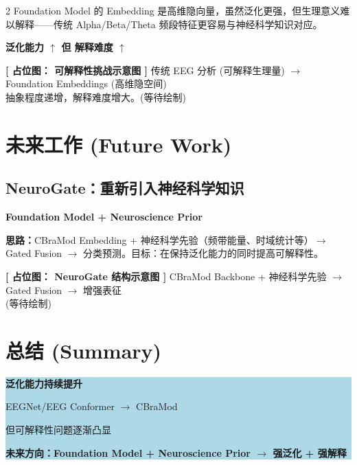 \documentclass[12pt, a0paper]{article}
\renewcommand{\normalsize}{\fontsize{20}{27}\selectfont}
\renewcommand{\large}{\fontsize{24}{32}\selectfont}
\renewcommand{\Large}{\fontsize{28}{36}\selectfont}
\renewcommand{\small}{\fontsize{16}{22}\selectfont}
\newcommand{\placeholderh}[3]{%
    \begin{center}
    \colorbox{mygray!12}{\parbox{0.9\columnwidth}{%
        \centering
        \vspace{1.2em}
        {\Large\bfseries\color{mygray} [ 占位图： #1 ]}
        \vspace{0.8em}
        {\small\color{mygray} #2}
        \vspace{#3}
    }}
    \end{center}
}
\begin{document}
\begin{multicols}{2}
Foundation Model 的 Embedding 是高维隐向量，虽然泛化更强，但生理意义难以解释——传统 Alpha/Beta/Theta 频段特征更容易与神经科学知识对应。

\begin{center}
\colorbox{myorange!10}{\parbox{0.9\columnwidth}{\centering\bfseries
    泛化能力 $\uparrow$ \hspace{2em} 但 \hspace{2em} 解释难度 $\uparrow$
}}
\end{center}

\placeholderh{可解释性挑战示意图}{%
    传统 EEG 分析 (可解释生理量) $\rightarrow$ Foundation Embeddings (高维隐空间)\\
    抽象程度递增，解释难度增大。\quad (等待绘制)}{2.5cm}

\section{未来工作 (Future Work)}

\subsection{NeuroGate：重新引入神经科学知识}

\begin{center}
\large\bfseries
Foundation Model \quad + \quad Neuroscience Prior
\end{center}

\textbf{思路：}CBraMod Embedding $+$ 神经科学先验（频带能量、时域统计等）$\rightarrow$ Gated Fusion $\rightarrow$ 分类预测。目标：在保持泛化能力的同时提高可解释性。

\placeholderh{NeuroGate 结构示意图}{%
    CBraMod Backbone + 神经科学先验 $\rightarrow$ Gated Fusion $\rightarrow$ 增强表征\\
    \small (等待绘制)}{2.8cm}

\section{总结 (Summary)}

\begin{center}
\colorbox{lightblue}{\parbox{0.95\columnwidth}{\centering
    {\Large\bfseries
        泛化能力持续提升\par}
    \vspace{0.8em}
    {\normalsize
        EEGNet/EEG Conformer $\rightarrow$ CBraMod\par}
    \vspace{0.5em}
    {\normalsize
        但可解释性问题逐渐凸显\par}
    \vspace{0.8em}
    {\large\bfseries
        未来方向：Foundation Model + Neuroscience Prior
        $\rightarrow$ 强泛化 + 强解释\par}
}}
\end{center}


\end{multicols}
\end{document}
